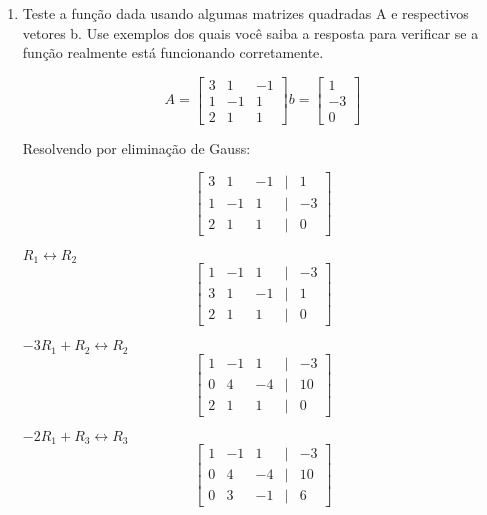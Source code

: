 \documentclass[leqno]{article}
\numberwithin{equation}{section}
\begin{document}
	\begin{enumerate}
		
		
		\item  Teste a função dada usando algumas matrizes quadradas A e respectivos 
		vetores b. Use exemplos dos quais você saiba a resposta para verificar se a 
		função realmente está funcionando corretamente.
		
		\begin{sol}
			$$A = \begin{bmatrix}
				3 & 1 & -1\\
				1 & -1 & 1\\
				2 & 1 & 1
			\end{bmatrix}  b = \begin{bmatrix}
				1 \\
				-3 \\
				0
			\end{bmatrix} $$

		Resolvendo por eliminação de Gauss:
		
		$$\begin{bmatrix}
			3 & 1 & -1 & | & 1\\
			1 & -1 & 1 & | & -3\\
			2 & 1 & 1 & | & 0
		\end{bmatrix}$$
	
		$R_1 \longleftrightarrow R_2$
		$$\begin{bmatrix}
			1 & -1 & 1 & | & -3\\
			3 & 1 & -1 & | & 1\\
			2 & 1 & 1 & | & 0
		\end{bmatrix}$$
		
		$-3R_1 + R_2 \longleftrightarrow R_2$
		$$\begin{bmatrix}
			1 & -1 & 1 & | & -3\\
			0 & 4 & -4 & | & 10\\
			2 & 1 & 1 & | & 0
		\end{bmatrix}$$
		
		$-2R_1 + R_3 \longleftrightarrow R_3$
		$$\begin{bmatrix}
			1 & -1 & 1 & | & -3\\
			0 & 4 & -4 & | & 10\\
			0 & 3 & -1 & | & 6
		\end{bmatrix}$$
	

\end{sol}
\end{enumerate}
\end{document}
